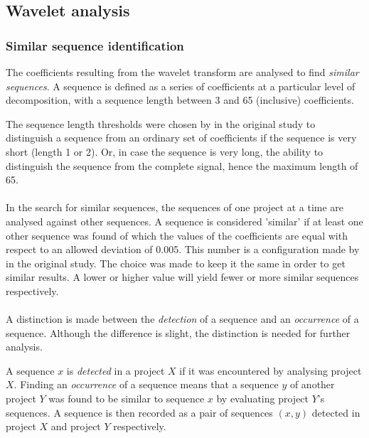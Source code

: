 \subsection{Wavelet analysis}
\subsubsection{Similar sequence identification}
The coefficients resulting from the wavelet transform are analysed to find
\textit{similar sequences}. A sequence is defined as a series of coefficients
at a particular level of decomposition, with a sequence length between 3 and 65
(inclusive) coefficients.

The sequence length thresholds were chosen by \citet{karus2013} in the original
study to distinguish a sequence from an ordinary set of coefficients if the
sequence is very short (length 1 or 2). Or, in case the sequence is very long,
the ability to distinguish the sequence from the complete signal, hence the
maximum length of 65.

\paragraph{}
In the search for similar sequences, the sequences of one project at a time are
analysed against other sequences. A sequence is considered 'similar' if at
least one other sequence was found of which the values of the coefficients are
equal with respect to an allowed deviation of 0.005. This number is a
configuration made by \citeauthor{karus2013} in the original study.
The choice was made to keep it the same in order to get similar results.
A lower or higher value will yield fewer or more similar sequences
respectively.

\paragraph{}
A distinction is made between the \textit{detection} of a sequence and an
\textit{occurrence} of a sequence. Although the difference is slight, the
distinction is needed for further analysis.

A sequence $x$ is \textit{detected} in a project $X$ if it was encountered by
analysing project $X$. Finding an \textit{occurrence} of a sequence means that
a sequence $y$ of another project $Y$ was found to be similar to sequence $x$
by evaluating project $Y$'s sequences. A sequence is then recorded as a pair of
sequences $(x, y)$ detected in project $X$ and project $Y$ respectively.

